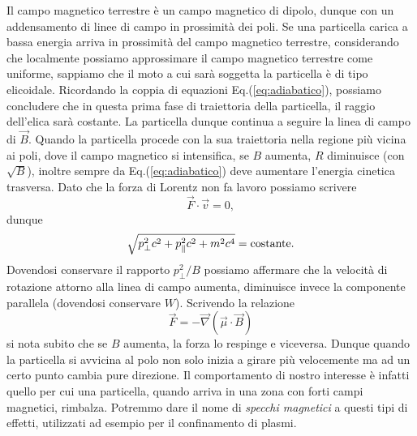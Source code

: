 \begin{example}
    Il campo magnetico terrestre è un campo magnetico di dipolo, dunque con un addensamento di linee di campo in prossimità dei poli. Se una particella carica a bassa energia arriva in prossimità del campo magnetico terrestre, considerando che localmente possiamo approssimare il campo magnetico terrestre come uniforme, sappiamo che il moto a cui sarà soggetta la particella è di tipo elicoidale. Ricordando la coppia di equazioni Eq.(\ref{eq:adiabatico}), possiamo concludere che in questa prima fase di traiettoria della particella, il raggio dell'elica sarà costante. La particella dunque continua a seguire la linea di campo di $\vec{B}$. Quando la particella procede con la sua traiettoria nella regione più vicina ai poli, dove il campo magnetico si intensifica, se $B$ aumenta, $R$ diminuisce (con $\sqrt{B}$), inoltre sempre da Eq.(\ref{eq:adiabatico}) deve aumentare l'energia cinetica trasversa. Dato che la forza di Lorentz non fa lavoro possiamo scrivere
    \begin{equation*}
        \vec{F} \cdot \vec{v} = 0,
    \end{equation*}
    dunque
    \begin{equation*}
        \sqrt{p_\bot^2 c^2 + p_\parallel ^2 c^2 + m^2 c^4} = \textup{costante}.
    \end{equation*}
    Dovendosi conservare il rapporto $p_\bot^2 / B$ possiamo affermare che la velocità di rotazione attorno alla linea di campo aumenta, diminuisce invece la componente parallela (dovendosi conservare $W$). Scrivendo la relazione 
    \begin{equation*}
        \vec{F} = - \vec{\nabla} (\vec{\mu} \cdot \vec{B})
    \end{equation*}
    si nota subito che se $B$ aumenta, la forza lo respinge e viceversa. Dunque quando la particella si avvicina al polo non solo inizia a girare più velocemente ma ad un certo punto cambia pure direzione. Il comportamento di nostro interesse è infatti quello per cui una particella, quando arriva in una zona con forti campi magnetici, rimbalza. Potremmo dare il nome di \emph{specchi magnetici} a questi tipi di effetti, utilizzati ad esempio per il confinamento di plasmi.
\end{example}

